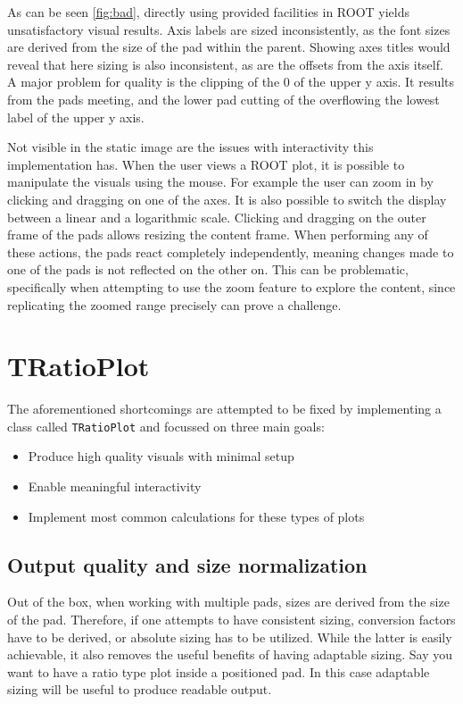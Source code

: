 As can be seen \autoref{fig:bad}, directly using provided facilities in ROOT yields
unsatisfactory visual results. Axis labels are sized inconsistently, as the font sizes
are derived from the size of the pad within the parent. Showing axes titles would reveal
that here sizing is also inconsistent, as are the offsets from the axis itself. A major
problem for quality is the clipping of the 0 of the upper y axis. It results from the pads meeting,
and the lower pad cutting of the overflowing the lowest label of the upper y axis.

Not visible in the static image are the issues with interactivity this implementation has. When the user
views a ROOT plot, it is possible to manipulate the visuals using the mouse. For example 
the user can zoom in by clicking and dragging on one of the axes. It is also possible to switch
the display between a linear and a logarithmic scale. Clicking and dragging on the outer frame of the 
pads allows resizing the content frame. When performing any of these actions, the pads
react completely independently, meaning changes made to one of the pads is not reflected
on the other on. This can be problematic, specifically when attempting to use the zoom
feature to explore the content, since replicating the zoomed range precisely can prove a challenge.

\section{TRatioPlot}

The aforementioned shortcomings are attempted to be fixed by implementing a class called \texttt{TRatioPlot} and focussed on three main goals:

\begin{itemize}
  \item Produce high quality visuals with minimal setup
  \item Enable meaningful interactivity
  \item Implement most common calculations for these types of plots
\end{itemize}

\subsection{Output quality and size normalization}
Out of the box, when working with multiple pads, sizes are derived from the size of the pad. Therefore, if one
attempts to have consistent sizing, conversion factors have to be derived, or absolute sizing has to be utilized. While the latter is easily achievable, it also removes the useful benefits of having adaptable sizing. Say
you want to have a ratio type plot inside a positioned pad. In this case adaptable sizing will be useful to
produce readable output.

